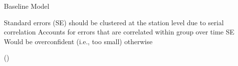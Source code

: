





\begin{frame}{Baseline Model}


\begin{outline}
    \1 Standard errors (SE) should be clustered at the station level due to serial correlation 
    \2 Accounts for errors that are correlated within group over time 
    \2 SE Would be overconfident (i.e., too small) otherwise
\end{outline}


\begin{center}
(\cite{Huntington2022})   
\end{center}

\end{frame}










